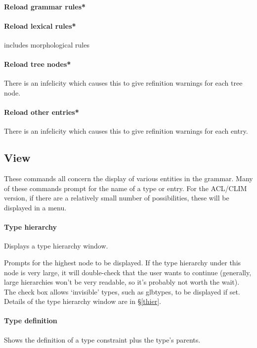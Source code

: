 \documentclass[12pt]{report}
\begin{document}
\paragraph{Reload grammar rules*}

\paragraph{Reload lexical rules*}
includes morphological rules

\paragraph{Reload tree nodes*}
There is an infelicity which causes 
this to give refinition warnings for each tree node. 

\paragraph{Reload other entries*}
There is an infelicity which causes
this to give refinition warnings for each entry.

\subsection{View}
\label{view}

These commands all concern the display of various entities in the grammar.
Many of these commands prompt for the name of a type or entry.
For the ACL/CLIM version, if there are a relatively small number of
possibilities, these will be displayed in a menu.

\paragraph{Type hierarchy}
Displays a type hierarchy window.

Prompts for the highest node to be displayed.
If the type hierarchy under this node is very large, it will
double-check that the user wants to continue (generally, 
large hierarchies won't be very readable, so it's probably not 
worth the wait). 
The check box allows `invisible' types, such as glbtypes, to be
displayed if set.  Details of the type hierarchy window are in 
\S\ref{thier}.   

\paragraph{Type definition}
\label{type-def}
Shows the definition of a type constraint plus the type's 
parents.
\end{document}

